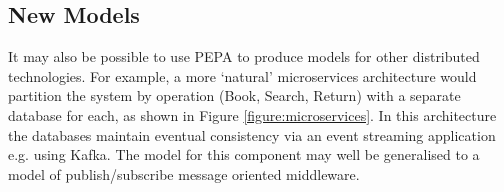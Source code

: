 \documentclass[runningheads]{llncs}
\begin{document}
\subsection{New Models}
It may also be possible to use PEPA to produce models for other distributed technologies.  For example, a more `natural' microservices architecture would partition the system by operation (Book, Search, Return) with a separate database for each, as shown in Figure \ref{figure:microservices}.  In this architecture the databases maintain eventual consistency via an event streaming application e.g. using Kafka.  The model for this component may well be generalised to a model of publish/subscribe message oriented middleware.

%
%



\end{document}
